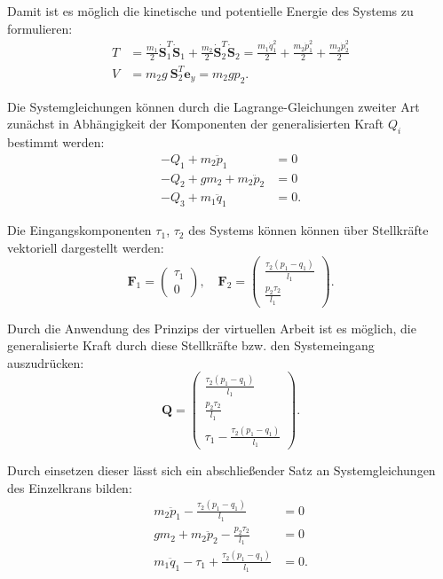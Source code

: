 Damit ist es möglich die kinetische und potentielle Energie des Systems zu formulieren:
\begin{align}
	T &= \frac{m_1}{2} \dot{\mathbf{S}}_1^T \dot{\mathbf{S}}_1 + \frac{m_2}{2} \dot{\mathbf{S}}_2^T \dot{\mathbf{S}}_2 = \frac{m_{1} \dot{q}_{1}^{2}}{2} + \frac{m_{2} \dot{p}_{1}^{2}}{2} + \frac{m_{2} \dot{p}_{2}^{2}}{2} \\
	V &= m_2 g \ \mathbf{S}_2^T \mathbf{e}_y = m_{2} g p_{2}.
\end{align}

Die Systemgleichungen können durch die Lagrange-Gleichungen zweiter Art zunächst in Abhängigkeit der Komponenten der generalisierten Kraft $Q_i$ bestimmt werden:
\begin{align}
	- Q_{1} + m_{2} \ddot{p}_{1} &= 0\\
	- Q_{2} + g m_{2} + m_{2} \ddot{p}_{2} &= 0\\
	- Q_{3} + m_{1} \ddot{q}_{1} &= 0.
\end{align}

Die Eingangskomponenten $\tau_1$, $\tau_2$ des Systems können können über Stellkräfte vektoriell dargestellt werden:
\begin{equation}
	\mathbf{F}_1 =
	\left(\begin{matrix}
		\tau_{1} \\
		0
	\end{matrix}\right), \quad
	\mathbf{F}_2 =
	\left(\begin{matrix}
		\frac{\tau_{2} \left(p_{1} - q_{1}\right)}{l_{1}}\\
		\frac{p_{2} \tau_{2}}{l_{1}}
	\end{matrix}\right).
\end{equation}

Durch die Anwendung des Prinzips der virtuellen Arbeit ist es möglich, die generalisierte Kraft durch diese Stellkräfte bzw. den Systemeingang auszudrücken:
\begin{equation}
	\mathbf{Q}=
	\left(\begin{matrix}
		\frac{\tau_{2} \left(p_{1} - q_{1}\right)}{l_{1}}\\
		\frac{p_{2} \tau_{2}}{l_{1}}\\
		\tau_{1} - \frac{\tau_{2} \left(p_{1} - q_{1}\right)}{l_{1}}
	\end{matrix}\right).
\end{equation}

Durch einsetzen dieser lässt sich ein abschließender Satz an Systemgleichungen des Einzelkrans bilden:
\begin{align}
	m_{2} \ddot{p}_{1} - \frac{\tau_{2} \left(p_{1} - q_{1}\right)}{l_{1}} &= 0\\
	g m_{2} + m_{2} \ddot{p}_{2} - \frac{p_{2} \tau_{2}}{l_{1}} &= 0\\
	m_{1} \ddot{q}_{1} - \tau_{1} + \frac{\tau_{2} \left(p_{1} - q_{1}\right)}{l_{1}} &= 0.
\end{align}

